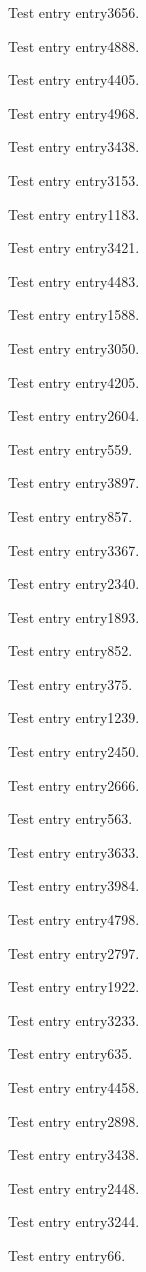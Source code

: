 Test entry \gls{entry3656}.

Test entry \gls{entry4888}.

Test entry \gls{entry4405}.

Test entry \gls{entry4968}.

Test entry \gls{entry3438}.

Test entry \gls{entry3153}.

Test entry \gls{entry1183}.

Test entry \gls{entry3421}.

Test entry \gls{entry4483}.

Test entry \gls{entry1588}.

Test entry \gls{entry3050}.

Test entry \gls{entry4205}.

Test entry \gls{entry2604}.

Test entry \gls{entry559}.

Test entry \gls{entry3897}.

Test entry \gls{entry857}.

Test entry \gls{entry3367}.

Test entry \gls{entry2340}.

Test entry \gls{entry1893}.

Test entry \gls{entry852}.

Test entry \gls{entry375}.

Test entry \gls{entry1239}.

Test entry \gls{entry2450}.

Test entry \gls{entry2666}.

Test entry \gls{entry563}.

Test entry \gls{entry3633}.

Test entry \gls{entry3984}.

Test entry \gls{entry4798}.

Test entry \gls{entry2797}.

Test entry \gls{entry1922}.

Test entry \gls{entry3233}.

Test entry \gls{entry635}.

Test entry \gls{entry4458}.

Test entry \gls{entry2898}.

Test entry \gls{entry3438}.

Test entry \gls{entry2448}.

Test entry \gls{entry3244}.

Test entry \gls{entry66}.

